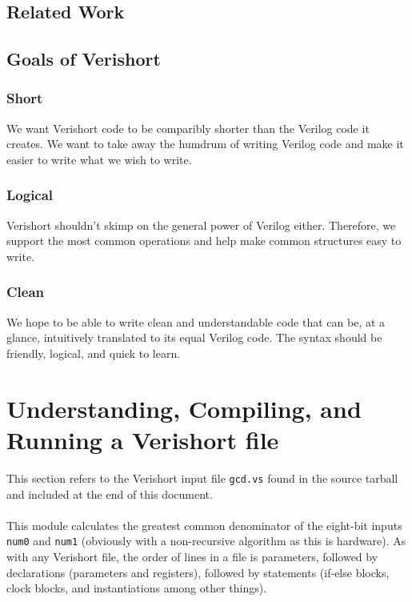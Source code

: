 \documentclass[letterpaper,11pt]{article}
\begin{document}
    \subsection{Related Work}
        \subsection{Goals of Verishort}
        \subsubsection{Short}
        We want Verishort code to be comparibly shorter than the Verilog code it creates. We want to
        take away the humdrum of writing Verilog code and make it easier to write what we wish to write. 
        \subsubsection{Logical}
        Verishort shouldn't skimp on the general power of Verilog either. Therefore, we support the most
        common operations and help make common structures easy to write. 
        \subsubsection{Clean}
        We hope to be able to write clean and understandable code that can be, at a glance, intuitively 
        translated to its equal Verilog code. The syntax should be friendly, logical, and quick to learn.



\section{Understanding, Compiling, and Running a Verishort file}
This section refers to the Verishort input file \texttt{gcd.vs} found in the source tarball and included at the end of this document.\\\\
This module calculates the greatest common denominator of the eight-bit inputs \texttt{num0} and \texttt{num1} (obviously with a non-recursive algorithm as this is hardware).  As with any Verishort file, the order of lines in a file is parameters, followed by declarations (parameters and registers), followed by statements (if-else blocks, clock blocks, and instantiations among other things).\\\\
\end{document}
